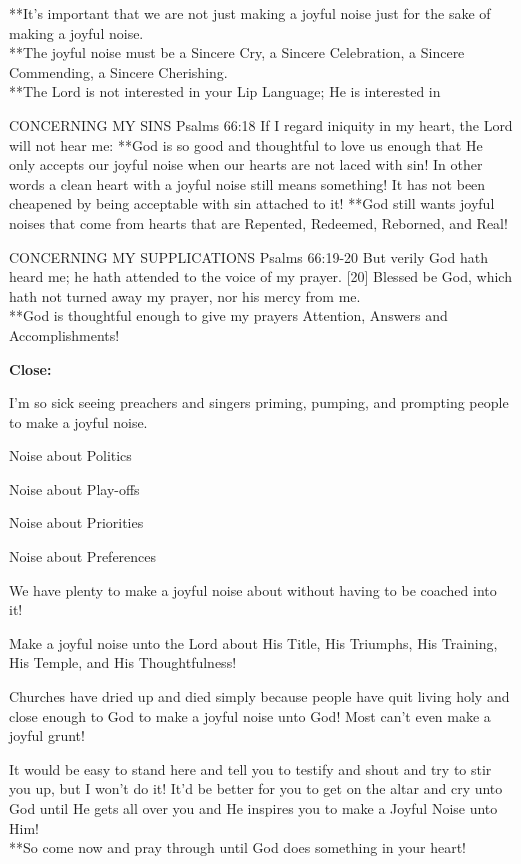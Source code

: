 \begin{compactenum}[I.][5]
\begin{compactenum}[A.]
**It’s important that we are not just making a joyful noise just for the sake of making a joyful noise.\\
**The joyful noise must be a Sincere Cry, a Sincere Celebration, a Sincere Commending, a Sincere Cherishing.\\
**The Lord is not interested in your Lip Language; He is interested in         \item CONCERNING MY SINS
Psalms 66:18   If I regard iniquity in my heart, the Lord
will not hear me: 
**God is so good and thoughtful to love us enough that He only accepts our joyful noise when our hearts are not laced with sin!  In other words a clean heart with a joyful noise still means something!  It has not been cheapened by being acceptable with sin attached to it!
**God still wants joyful noises that come from hearts that are Repented, Redeemed, Reborned, and Real!
        \item CONCERNING MY SUPPLICATIONS 
Psalms 66:19-20  But verily God hath heard me; he
hath attended to the voice of my prayer.   [20] Blessed be God, which hath not turned away my prayer, nor his mercy from me.\\**God is thoughtful enough to give my prayers Attention, Answers and Accomplishments!\\
    \end{compactenum}
\end{compactenum}


\noindent \textbf{Close:} 
\begin{compactenum}
    \item I’m so sick seeing preachers and singers priming, pumping, and prompting people to make a joyful noise.
    \begin{compactenum}[a.]
        \item Noise about Politics
        \item Noise about Play-offs
        \item Noise about Priorities
        \item Noise about Preferences
    \end{compactenum}
    \item We have plenty to make a joyful noise about without having to be coached into it!
    \item Make a joyful noise unto the Lord about His Title, His Triumphs, His Training, His Temple, and His Thoughtfulness! 
    \item Churches have dried up and died simply because people have quit living holy and close enough to God to make a joyful noise unto God! Most can’t even make a joyful grunt!
    \item It would be easy to stand here and tell you to testify and shout and try to stir you up, but I won’t do it!  It’d be better for you to get on the altar and cry unto God until He gets all over you and He inspires you to make a Joyful Noise unto Him!\\
    **So come now and pray through until God does something in your heart!
\end{compactenum}